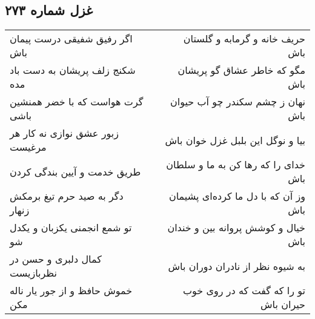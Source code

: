\begin{center}
\section*{غزل شماره ۲۷۳}
\label{sec:sh273}
\begin{longtable}{l p{0.5cm} r}
اگر رفیق شفیقی درست پیمان باش
&&
حریف خانه و گرمابه و گلستان باش
\\
شکنج زلف پریشان به دست باد مده
&&
مگو که خاطر عشاق گو پریشان باش
\\
گرت هواست که با خضر همنشین باشی
&&
نهان ز چشم سکندر چو آب حیوان باش
\\
زبور عشق نوازی نه کار هر مرغیست
&&
بیا و نوگل این بلبل غزل خوان باش
\\
طریق خدمت و آیین بندگی کردن
&&
خدای را که رها کن به ما و سلطان باش
\\
دگر به صید حرم تیغ برمکش زنهار
&&
وز آن که با دل ما کرده‌ای پشیمان باش
\\
تو شمع انجمنی یکزبان و یکدل شو
&&
خیال و کوشش پروانه بین و خندان باش
\\
کمال دلبری و حسن در نظربازیست
&&
به شیوه نظر از نادران دوران باش
\\
خموش حافظ و از جور یار ناله مکن
&&
تو را که گفت که در روی خوب حیران باش
\\
\end{longtable}
\end{center}
